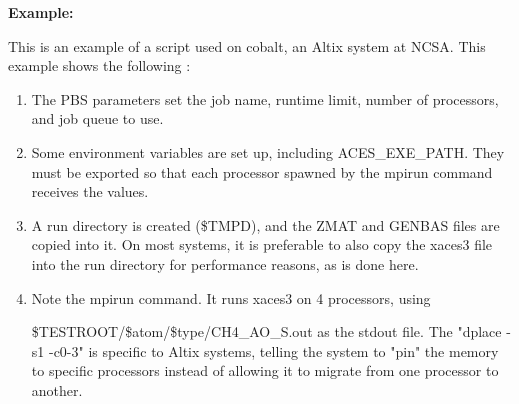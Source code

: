 \documentclass[12pt]{article}
\begin{document}
\noindent 
{\bf Example:}  

\noindent 
This is an example of a script used on cobalt, an Altix system at NCSA. This example shows 
the following : 

\begin{enumerate} 

\item The PBS parameters set the job name, runtime limit, number of processors, and job 
         queue to use.

\item Some environment variables are set up, including ACES\_EXE\_PATH. They must be 
         exported so that each processor spawned by the mpirun command receives the values. 

\item A run directory is created (\$TMPD), and the ZMAT and GENBAS files are copied 
         into it.  On most systems, it is preferable to also copy the xaces3 file into the 
         run directory for performance reasons, as is done here.

\item Note the mpirun command. It runs xaces3 on 4 processors, using 

         \$TESTROOT/\$atom/\$type/CH4\_AO\_S.out as the stdout file. The "dplace -s1 -c0-3" is 
         specific to Altix systems, telling the system to "pin" the memory to specific 
         processors instead of allowing it to migrate from one processor to another.

\end{enumerate} 
\end{document}
